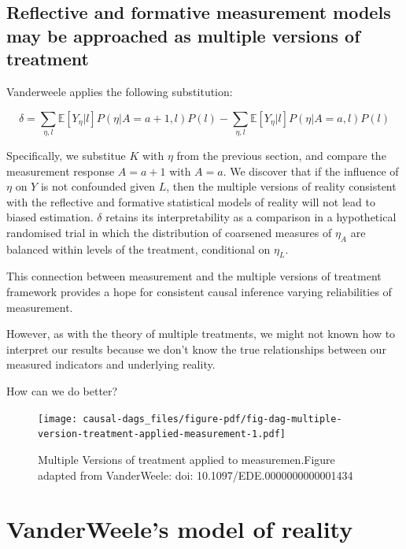 \documentclass[
  singlecolumn]{report}
\begin{document}
\hypertarget{reflective-and-formative-measurement-models-may-be-approached-as-multiple-versions-of-treatment}{%
\subsection{Reflective and formative measurement models may be
approached as multiple versions of
treatment}\label{reflective-and-formative-measurement-models-may-be-approached-as-multiple-versions-of-treatment}}

Vanderweele applies the following substitution:

\[\delta = \sum_{\eta,l} \mathbb{E}[Y_\eta|l] P(\eta|A=a+1,l) P(l) - \sum_{\eta,l} \mathbb{E}[Y_\eta|l] P(\eta|A=a,l) P(l)\]

Specifically, we substitue \(K\) with \(\eta\) from the previous
section, and compare the measurement response \(A = a + 1\) with
\(A = a\). We discover that if the influence of \(\eta\) on \(Y\) is not
confounded given \(L\), then the multiple versions of reality consistent
with the reflective and formative statistical models of reality will not
lead to biased estimation. \(\delta\) retains its interpretability as a
comparison in a hypothetical randomised trial in which the distribution
of coarsened measures of \(\eta_A\) are balanced within levels of the
treatment, conditional on \(\eta_L\).

This connection between measurement and the multiple versions of
treatment framework provides a hope for consistent causal inference
varying reliabilities of measurement.

However, as with the theory of multiple treatments, we might not known
how to interpret our results because we don't know the true
relationships between our measured indicators and underlying reality.

How can we do better?

\begin{figure}

{\centering \texttt{[image: causal-dags\_files/figure-pdf/fig-dag-multiple-version-treatment-applied-measurement-1.pdf]}

}

\caption{\label{fig-dag-multiple-version-treatment-applied-measurement}Multiple
Versions of treatment applied to measuremen.Figure adapted from
VanderWeele: doi: 10.1097/EDE.0000000000001434}

\end{figure}

\hypertarget{vanderweeles-model-of-reality}{%
\section{VanderWeele's model of
reality}\label{vanderweeles-model-of-reality}}
\end{document}
